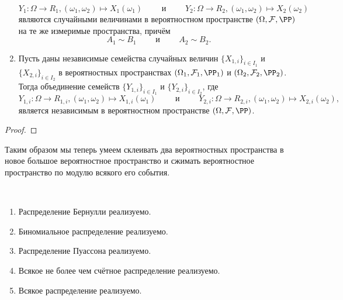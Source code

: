 \documentclass[12pt,a4paper]{article}
\begin{document}
\begin{theorem}
\begin{enumerate}
                \[Y_1: \Omega \to R_1, (\omega_1, \omega_2) \mapsto X_1(\omega_1) \qquad \text{ и } \qquad Y_2: \Omega \to R_2, (\omega_1, \omega_2) \mapsto X_2(\omega_2)\]
                являются случайными величинами в вероятностном пространстве $(\Omega, \mathcal{F}, \PP)$ на те же измеримые пространства, причём
                \[A_1 \sim B_1 \qquad \text{ и } \qquad A_2 \sim B_2.\]
            \item Пусть даны независимые семейства случайных величин $\{X_{1,i}\}_{i \in I_1}$ и $\{X_{2, i}\}_{i \in I_2}$ в вероятностных пространствах $(\Omega_1, \mathcal{F}_1, \PP_1)$ и $(\Omega_2, \mathcal{F}_2, \PP_2)$. Тогда объединение семейств $\{Y_{1, i}\}_{i \in I_1}$ и $\{Y_{2, i}\}_{i \in I_2}$, где
                \[Y_{1, i}: \Omega \to R_{1, i}, (\omega_1, \omega_2) \mapsto X_{1, i}(\omega_1) \qquad \text{ и } \qquad Y_{2, i}: \Omega \to R_{2, i}, (\omega_1, \omega_2) \mapsto X_{2, i}(\omega_2),\]
                является независимым в вероятностном пространстве $(\Omega, \mathcal{F}, \PP)$.
        \end{enumerate}
    \end{theorem}

    \begin{proof}
    \end{proof}

    \begin{theorem}
    \end{theorem}

    \begin{remark*}
        Таким образом мы теперь умеем склеивать два вероятностных пространства в новое большое вероятностное пространство и сжимать вероятностное пространство по модулю всякого его события.
    \end{remark*}

    \begin{theorem}\ 
        \begin{enumerate}
            \item Распределение Бернулли реализуемо.
            \item Биномиальное распределение реализуемо.
            \item Распределение Пуассона реализуемо.
            \item Всякое не более чем счётное распределение реализуемо.
            \item Всякое распределение реализуемо.
        \end{enumerate}
    \end{theorem}
\end{document}
